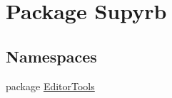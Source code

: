 \hypertarget{namespace_supyrb}{\section{Package Supyrb}
\label{namespace_supyrb}
}
\subsection*{Namespaces}
\begin{DoxyCompactItemize}
\item 
package \hyperlink{namespace_supyrb_1_1_editor_tools}{Editor\-Tools}
\end{DoxyCompactItemize}
